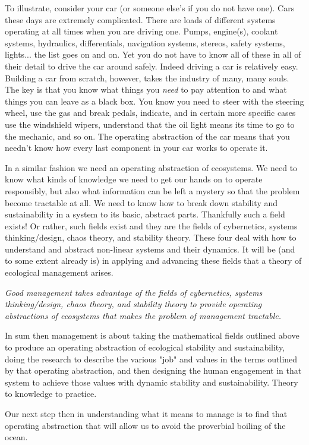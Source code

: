 \documentclass[11pt,a5paper]{article}
\begin{document}
To illustrate, consider your car (or someone else's if you do not have one). Cars these days are extremely complicated. There are loads of different systems operating at all times when you are driving one. Pumps, engine(s), coolant systems, hydraulics, differentials, navigation systems, stereos, safety systems, lights... the list goes on and on. Yet you do not have to know all of these in all of their detail to drive the car around safely. Indeed driving a car is relatively easy. Building a car from scratch, however, takes the industry of many, many souls. The key is that you know what things you \textit{need} to pay attention to and what things you can leave as a black box. You know you need to steer with the steering wheel, use the gas and break pedals, indicate, and in certain more specific cases use the windshield wipers, understand that the oil light means its time to go to the mechanic, and so on. The operating abstraction of the car means that you needn't know how every last component in your car works to operate it. 

In a similar fashion we need an operating abstraction of ecosystems. We need to know what kinds of knowledge we need to get our hands on to operate responsibly, but also what information can be left a mystery so that the problem become tractable at all. We need to know how to break down stability and sustainability in a system to its basic, abstract parts. Thankfully such a field exists! Or rather, such fields exist and they are the fields of cybernetics, systems thinking/design, chaos theory, and stability theory. These four deal with how to understand and abstract non-linear systems and their dynamics. It will be (and to some extent already is) in applying and advancing these fields that a theory of ecological management arises. \newline

\textit{Good management takes advantage of the fields of cybernetics, systems thinking/design, chaos theory, and stability theory to provide operating abstractions of ecosystems that makes the problem of management tractable.}\newline

In sum then management is about taking the mathematical fields outlined above to produce an operating abstraction of ecological stability and sustainability, doing the research to describe the various "job" and values in the terms outlined by that operating abstraction, and then designing the human engagement in that system to achieve those values with dynamic stability and sustainability. Theory to knowledge to practice. \newline

Our next step then in understanding what it means to manage is to find that operating abstraction that will allow us to avoid the proverbial boiling of the ocean. 







\end{document}
